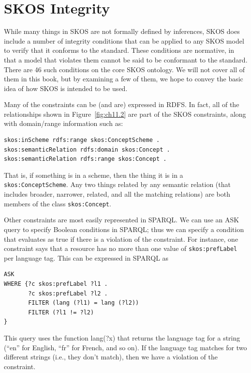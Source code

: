 \section{SKOS Integrity}

While many things in SKOS are not formally defined by inferences, SKOS does
include a number of integrity conditions that can be applied to any SKOS
model to verify that it conforms to the standard. These conditions are
normative, in that a model that violates them cannot be said to be
conformant to the standard. There are 46 such conditions on the core
SKOS ontology. We will not cover all of them in this book, but by
examining a few of them, we hope to convey the basic idea of how SKOS is
intended to be used.

Many of the constraints can be (and are) expressed in RDFS. In fact, all
of the relationships shown in Figure~\ref{fig:ch11.2} are part of the SKOS
constraints, along with domain/range information such as:

\begin{lstlisting}
skos:inScheme rdfs:range skos:ConceptScheme .
skos:semanticRelation rdfs:domain skos:Concept .
skos:semanticRelation rdfs:range skos:Concept .
\end{lstlisting}

That is, if something is in a scheme, then the thing it is in a
\texttt{skos:ConceptScheme}. Any two things related by any semantic relation
(that includes broader, narrower, related, and all the matching
relations) are both members of the class \texttt{skos:Concept}.

Other constraints are most easily represented in SPARQL. We can use an
ASK query to specify Boolean conditions in SPARQL; thus we can specify a
condition that evaluates as true if there is a violation of the
constraint. For instance, one constraint says that a resource has no
more than one value of \texttt{skos:prefLabel} per language tag. This can be
expressed in SPARQL as

\begin{lstlisting}
ASK
WHERE {?c skos:prefLabel ?l1 .
       ?c skos:prefLabel ?l2 .
       FILTER (lang (?l1) = lang (?l2))
       FILTER (?l1 != ?l2)
}
\end{lstlisting}

This query uses the function lang(?x) that returns the language tag for
a string (``en'' for English, ``fr'' for French, and so on). If the
language tag matches for two different strings (i.e., they don't match),
then we have a violation of the constraint.

